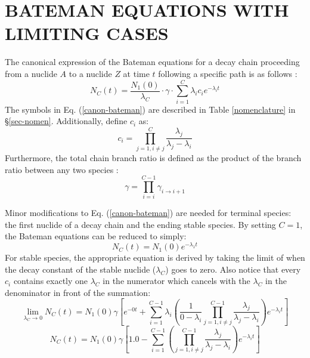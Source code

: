 \documentclass[letterpaper]{physor2018}
\begin{document}
\section{BATEMAN EQUATIONS WITH LIMITING CASES}
\label{sec-normal-method}
The canonical expression of the Bateman equations for a decay chain
proceeding from a nuclide $A$ to a nuclide $Z$ at time
$t$ following a specific path is as follows \cite{CETNAR2006640}:
\begin{equation}
\label{canon-bateman}
N_C(t) = \frac{N_1(0)}{\lambda_C} \cdot \gamma \cdot \sum_{i=1}^C \lambda_i c_{i} e^{-\lambda_i t}
\end{equation}
The symbols in Eq. (\ref{canon-bateman}) are described in
Table \ref{nomenclature} in \S\ref{sec-nomen}. Additionally, define $c_{i}$ as:
\begin{equation}
\label{c_i-def}
c_i = \prod_{j=1,i\ne j}^C \frac{\lambda_j}{\lambda_j - \lambda_i}
\end{equation}
Furthermore, the total chain branch ratio is defined as the product of the
branch ratio between any two species \cite{harr2007precise}:
\begin{equation}
\label{gamma-total}
\gamma = \prod_{i=i}^{C-1} \gamma_{i \to i+1}
\end{equation}

Minor modifications to Eq. (\ref{canon-bateman}) are needed for terminal species:
the first nuclide of a decay chain and the ending stable species. By setting $C=1$, the Bateman
equations can be reduced to simply:
\begin{equation}
\label{n-single}
N_C(t) = N_1(0) e^{-\lambda_1 t}
\end{equation}
For stable species, the appropriate equation is derived by taking the limit
of when the decay constant of the stable nuclide ($\lambda_C$) goes to
zero. Also notice that every $c_i$ contains exactly one $\lambda_C$
in the numerator which cancels with the $\lambda_C$ in the denominator
in front of the summation:
\begin{equation}
\label{stable-lim}
\lim_{\lambda_C \to 0} N_C(t) = N_1(0)  \gamma \left[e^{-0t} + \sum_{i=1}^{C-1} \lambda_i \left(\frac{1}{0 - \lambda_i} \prod_{j=1,i\ne j}^{C-1} \frac{\lambda_j}{\lambda_j - \lambda_i} \right) e^{-\lambda_i t} \right]
\end{equation}
\begin{equation}
\label{n-stable}
N_C(t) = N_1(0)  \gamma \left[1.0 - \sum_{i=1}^{C-1} \left(\prod_{j=1,i\ne j}^{C-1} \frac{\lambda_j}{\lambda_j - \lambda_i} \right) e^{-\lambda_i t} \right]
\end{equation}
\end{document}
